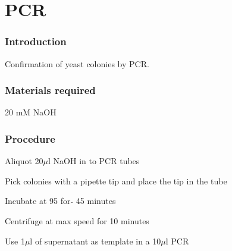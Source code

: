 \part{PCR}

\newpage
\setlength{\parindent}{0pt}
\setcounter{secnumdepth}{5}
\setcounter{section}{0}
\renewcommand*{\theHsection}{pcr.\the\value{section}}

\section{Introduction}
Confirmation of yeast colonies by PCR.
\section{Materials required}
	\begin{packed_enum}
	\item 20 mM NaOH
	\end{packed_enum}

\section{Procedure}
	\begin{packed_enum}
	\item Aliquot 20$\mu$l NaOH in to PCR tubes
	\item Pick colonies with a pipette tip and place the tip in the tube
	\item Incubate at {95\textcelsius} for  $\tilde{}$ 45 minutes
	\item Centrifuge at max speed for 10 minutes
	\item Use 1$\mu$l of supernatant as template in a 10$ \mu $l PCR
	\end{packed_enum}
